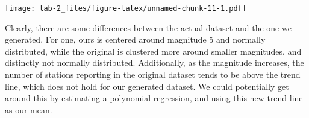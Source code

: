 \documentclass[]{article}
\newenvironment{Shaded}{\begin{snugshade}}{\end{snugshade}}
\newcommand{\KeywordTok}[1]{\textcolor[rgb]{0.13,0.29,0.53}{\textbf{#1}}}
\newcommand{\DataTypeTok}[1]{\textcolor[rgb]{0.13,0.29,0.53}{#1}}
\newcommand{\DecValTok}[1]{\textcolor[rgb]{0.00,0.00,0.81}{#1}}
\newcommand{\FloatTok}[1]{\textcolor[rgb]{0.00,0.00,0.81}{#1}}
\newcommand{\StringTok}[1]{\textcolor[rgb]{0.31,0.60,0.02}{#1}}
\newcommand{\OperatorTok}[1]{\textcolor[rgb]{0.81,0.36,0.00}{\textbf{#1}}}
\newcommand{\NormalTok}[1]{#1}
\begin{document}
\begin{Shaded}
\end{Shaded}

\texttt{[image: lab-2\_files/figure-latex/unnamed-chunk-11-1.pdf]}

Clearly, there are some differences between the actual dataset and the
one we generated. For one, ours is centered around magnitude 5 and
normally distributed, while the original is clustered more around
smaller magnitudes, and distinctly not normally distributed.
Additionally, as the magnitude increases, the number of stations
reporting in the original dataset tends to be above the trend line,
which does not hold for our generated dataset. We could potentially get
around this by estimating a polynomial regression, and using this new
trend line as our mean.
\end{document}
